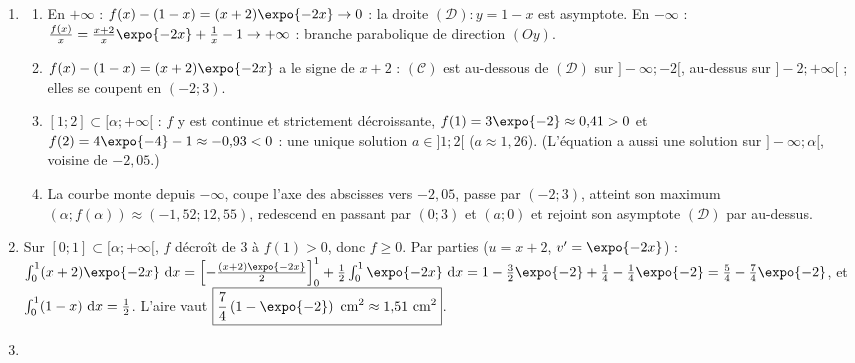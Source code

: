 \begin{corrige}
\begin{sol}
\begin{description}
\begin{enumerate}
\[\begin{array}{c|ccccc}
            x & -\infty & & \alpha & & +\infty \\ \hline
            f'(x) & & + & 0 & - & \\ \hline
            f(x) & -\infty & \nearrow & f(\alpha) & \searrow & -\infty
            \end{array}
            \]
      \item \begin{enumerate}
            \item En $+\infty$ : $f(x) - (1 - x) = (x + 2)\expo{-2x} \to 0$ : la droite $(\mathscr{D}) : y = 1 - x$ est asymptote.
                  En $-\infty$ : $\frac{f(x)}{x} = \frac{x + 2}{x}\expo{-2x} + \frac{1}{x} - 1 \to +\infty$ : branche parabolique de direction $(Oy)$.
            \item $f(x) - (1 - x) = (x + 2)\expo{-2x}$ a le signe de $x + 2$ : $(\mathscr{C})$ est au-dessous de $(\mathscr{D})$ sur
                  $]-\infty ; -2[$, au-dessus sur $]-2 ; +\infty[$ ; elles se coupent en $(-2 ; 3)$.
            \item $[1 ; 2] \subset [\alpha ; +\infty[$ : $f$ y est continue et strictement d\'ecroissante, $f(1) = 3\expo{-2} \approx 0{,}41 > 0$
                  et $f(2) = 4\expo{-4} - 1 \approx -0{,}93 < 0$ : une unique solution $a \in ]1 ; 2[$ ($a \approx 1{,}26$).
                  (L'\'equation a aussi une solution sur $]-\infty ; \alpha[$, voisine de $-2{,}05$.)
            \item La courbe monte depuis $-\infty$, coupe l'axe des abscisses vers $-2{,}05$, passe par $(-2 ; 3)$,
                  atteint son maximum $(\alpha ; f(\alpha)) \approx (-1{,}52 ; 12{,}55)$, redescend en passant par $(0 ; 3)$ et $(a ; 0)$
                  et rejoint son asymptote $(\mathscr{D})$ par au-dessus.
            \end{enumerate}
      \item Sur $[0 ; 1] \subset [\alpha ; +\infty[$, $f$ d\'ecro\^it de $3$ \`a $f(1) > 0$, donc $f \geq 0$.
            Par parties ($u = x + 2$, $v' = \expo{-2x}$) :
            $\int_0^1 (x + 2)\expo{-2x}\dx = \left[ -\frac{(x+2)\expo{-2x}}{2} \right]_0^1 + \frac{1}{2}\int_0^1 \expo{-2x}\dx
            = 1 - \frac{3}{2}\expo{-2} + \frac{1}{4} - \frac{1}{4}\expo{-2} = \frac{5}{4} - \frac{7}{4}\expo{-2}$,
            et $\int_0^1 (1 - x)~\mathrm{d}x = \frac{1}{2}$. L'aire vaut
            $\boxed{\frac{7}{4}\left( 1 - \expo{-2} \right)~\text{cm}^2 \approx 1{,}51~\text{cm}^2}$.
      \item \begin{enumerate}

\end{enumerate}
\end{enumerate}
\end{description}
\end{sol}
\end{corrige}
